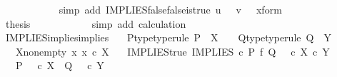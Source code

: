 \begin{isabellebody}
\ \ \ \ \ \ \ \ \ \ \isamarkupfalse%
\ {\isacharparenleft}{\kern0pt}simp\ add{\isacharcolon}{\kern0pt}\ IMPLIES{\isacharunderscore}{\kern0pt}false{\isacharunderscore}{\kern0pt}false{\isacharunderscore}{\kern0pt}is{\isacharunderscore}{\kern0pt}true\ {\isacartoucheopen}u\ {\isacharequal}{\kern0pt}\ {\isasymf}{\isacartoucheclose}\ {\isacartoucheopen}v\ {\isacharequal}{\kern0pt}\ {\isasymf}{\isacartoucheclose}\ x{\isacharunderscore}{\kern0pt}form{\isacharparenright}{\kern0pt}\isanewline
\ \ \ \ \ \ \ \ \isamarkupfalse%
\ \isamarkupfalse%
\ {\isacharquery}{\kern0pt}thesis\isanewline
\ \ \ \ \ \ \ \ \ \ \isamarkupfalse%
\ {\isacharparenleft}{\kern0pt}simp\ add{\isacharcolon}{\kern0pt}\ calculation{\isacharparenright}{\kern0pt}\isanewline
\ \ \ \ \ \ \isamarkupfalse%
\isanewline
\ \ \ \ \isamarkupfalse%
\isanewline
\ \ \isamarkupfalse%
\isanewline
{}\isamarkupfalse%
%
\endisatagproof
{\isafoldproof}%
%
\isadelimproof
\isanewline
%
\endisadelimproof
\isanewline
{}\isamarkupfalse%
\ IMPLIES{\isacharunderscore}{\kern0pt}implies{\isacharunderscore}{\kern0pt}implies{\isacharcolon}{\kern0pt}\isanewline
\ \ \ P{\isacharunderscore}{\kern0pt}type{\isacharbrackleft}{\kern0pt}type{\isacharunderscore}{\kern0pt}rule{\isacharbrackright}{\kern0pt}{\isacharcolon}{\kern0pt}\ {\isachardoublequoteopen}P\ {\isacharcolon}{\kern0pt}\ X\ {\isasymrightarrow}\ {\isasymOmega}{\isachardoublequoteclose}\ \ Q{\isacharunderscore}{\kern0pt}type{\isacharbrackleft}{\kern0pt}type{\isacharunderscore}{\kern0pt}rule{\isacharbrackright}{\kern0pt}{\isacharcolon}{\kern0pt}\ {\isachardoublequoteopen}Q\ {\isacharcolon}{\kern0pt}\ Y\ {\isasymrightarrow}\ {\isasymOmega}{\isachardoublequoteclose}\isanewline
\ \ \ X{\isacharunderscore}{\kern0pt}nonempty{\isacharcolon}{\kern0pt}\ {\isachardoublequoteopen}{\isasymexists}x{\isachardot}{\kern0pt}\ x\ {\isasymin}\isactrlsub c\ X{\isachardoublequoteclose}\isanewline
\ \ \ IMPLIES{\isacharunderscore}{\kern0pt}true{\isacharcolon}{\kern0pt}\ {\isachardoublequoteopen}IMPLIES\ {\isasymcirc}\isactrlsub c\ {\isacharparenleft}{\kern0pt}P\ {\isasymtimes}\isactrlsub f\ Q{\isacharparenright}{\kern0pt}\ {\isacharequal}{\kern0pt}\ {\isasymt}\ {\isasymcirc}\isactrlsub c\ {\isasymbeta}\isactrlbsub X\ {\isasymtimes}\isactrlsub c\ Y\isactrlesub {\isachardoublequoteclose}\isanewline
\ \ \ {\isachardoublequoteopen}{\isacharparenleft}{\kern0pt}P\ {\isacharequal}{\kern0pt}\ {\isasymt}\ {\isasymcirc}\isactrlsub c\ {\isasymbeta}\isactrlbsub X\isactrlesub {\isacharparenright}{\kern0pt}\ {\isasymLongrightarrow}\ {\isacharparenleft}{\kern0pt}Q\ {\isacharequal}{\kern0pt}\ {\isasymt}\ {\isasymcirc}\isactrlsub c\ {\isasymbeta}\isactrlbsub Y\isactrlesub {\isacharparenright}{\kern0pt}{\isachardoublequoteclose}\isanewline

\end{isabellebody}
